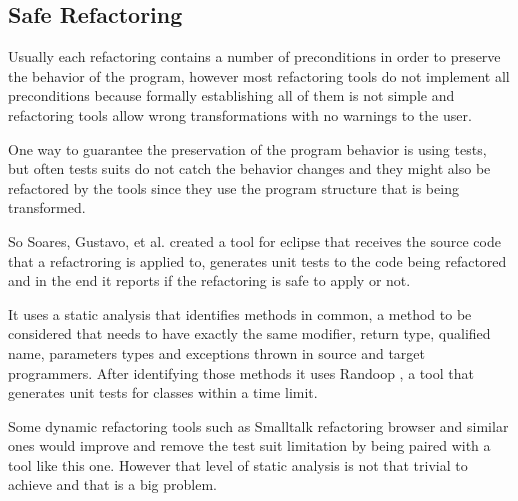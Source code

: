 
\subsection{Safe Refactoring}

Usually each refactoring contains a number of preconditions in order to preserve the behavior of the program, however most refactoring tools do not implement all preconditions because formally establishing all of them is not simple and refactoring tools allow wrong transformations with no warnings to the user.

One way to guarantee the preservation of the program behavior is using tests, but often tests suits do not catch the behavior changes and they might also be refactored by the tools since they use the program structure that is being transformed.

So Soares, Gustavo, et al. \cite{soares2010making} created a tool for eclipse that receives the source code that a refactroring is applied to, generates unit tests to the code being refactored and in the end it reports if the refactoring is safe to apply or not.

It uses a static analysis that identifies methods in common, a method to be considered that needs to have exactly the same modifier, return type, qualified name, parameters types and exceptions thrown in source and target programmers.
After identifying those methods it uses Randoop \cite{pacheco2007feedback},  %
 a tool that generates unit tests for classes within a time limit.

Some dynamic refactoring tools such as Smalltalk refactoring browser and similar ones would improve and remove the test suit limitation by being paired with a tool like this one. However that level of static analysis is not that trivial to achieve and that is a big problem. %
